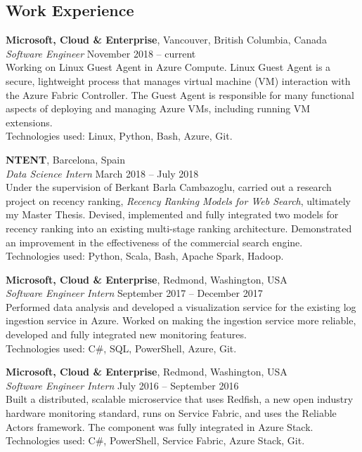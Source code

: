 \documentclass[margin,line]{resume}
\begin{document}
\begin{resume}
\vspace{-1mm}
\section{\mysidestyle Work Experience}

\textbf{Microsoft, Cloud \& Enterprise}, Vancouver, British Columbia, Canada \vspace{1mm}\\\vspace{1mm}%
\textsl{Software Engineer} \hfill November 2018 -- current\\%
Working on Linux Guest Agent in Azure Compute. Linux Guest Agent is a secure, lightweight process that manages virtual machine (VM) interaction with the Azure Fabric Controller. The Guest Agent is responsible for many functional aspects of deploying and managing Azure VMs, including running VM extensions. \\
Technologies used: Linux, Python, Bash, Azure, Git.

\textbf{NTENT}, Barcelona, Spain \vspace{1mm}\\\vspace{1mm}%
\textsl{Data Science Intern} \hfill March 2018 -- July 2018\\%
Under the supervision of Berkant Barla Cambazoglu, carried out a research project on recency ranking, \textit{Recency Ranking Models for Web Search}, ultimately my Master Thesis. Devised, implemented and fully integrated two models for recency ranking into an existing multi-stage ranking architecture. Demonstrated an improvement in the effectiveness of the commercial search engine. \\
Technologies used: Python, Scala, Bash, Apache Spark, Hadoop.

\textbf{Microsoft, Cloud \& Enterprise}, Redmond, Washington, USA \vspace{1mm}\\\vspace{1mm}%
\textsl{Software Engineer Intern} \hfill September 2017 -- December 2017\\%
Performed data analysis and developed a visualization service for the existing log ingestion service in Azure. Worked on making the ingestion service more reliable, developed and fully integrated new monitoring features. \\
Technologies used: C\#, SQL, PowerShell, Azure, Git.

\textbf{Microsoft, Cloud \& Enterprise}, Redmond, Washington, USA \vspace{1mm}\\\vspace{1mm}%
\textsl{Software Engineer Intern} \hfill July 2016 -- September 2016\\%
Built a distributed, scalable microservice that uses Redfish, a new open industry hardware monitoring standard, runs on Service Fabric, and uses the Reliable Actors framework. The component was fully integrated in Azure Stack. \\
Technologies used: C\#, PowerShell, Service Fabric, Azure Stack, Git.


\end{resume}
\end{document}
